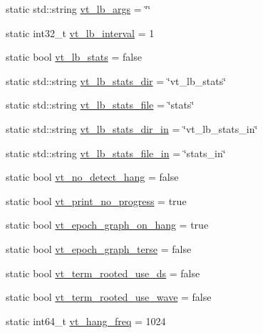 \begin{DoxyCompactItemize}
static std\+::string \hyperlink{structvt_1_1arguments_1_1_arg_config_aa9c190d04d0c6f9b3dac4ac56ac1a721}{vt\+\_\+lb\+\_\+args} = \char`\"{}\char`\"{}
\item 
static int32\+\_\+t \hyperlink{structvt_1_1arguments_1_1_arg_config_a273268a11a1525ad3754c72f5e6494b3}{vt\+\_\+lb\+\_\+interval} = 1
\item 
static bool \hyperlink{structvt_1_1arguments_1_1_arg_config_adf22250e9e2d60c5c57f41b8050f4697}{vt\+\_\+lb\+\_\+stats} = false
\item 
static std\+::string \hyperlink{structvt_1_1arguments_1_1_arg_config_a279d3953c475ea80bac06e2ed5ba6b5f}{vt\+\_\+lb\+\_\+stats\+\_\+dir} = \char`\"{}vt\+\_\+lb\+\_\+stats\char`\"{}
\item 
static std\+::string \hyperlink{structvt_1_1arguments_1_1_arg_config_ad6c76c8ec1dd43338a10f35929ce53f7}{vt\+\_\+lb\+\_\+stats\+\_\+file} = \char`\"{}stats\char`\"{}
\item 
static std\+::string \hyperlink{structvt_1_1arguments_1_1_arg_config_a2db08bf2d315dad981aaa9f5f79d31a5}{vt\+\_\+lb\+\_\+stats\+\_\+dir\+\_\+in} = \char`\"{}vt\+\_\+lb\+\_\+stats\+\_\+in\char`\"{}
\item 
static std\+::string \hyperlink{structvt_1_1arguments_1_1_arg_config_a7b294f12d448dcfe20f418db26a509bf}{vt\+\_\+lb\+\_\+stats\+\_\+file\+\_\+in} = \char`\"{}stats\+\_\+in\char`\"{}
\item 
static bool \hyperlink{structvt_1_1arguments_1_1_arg_config_a567d431e527d7a77c2bbddb4c52b781e}{vt\+\_\+no\+\_\+detect\+\_\+hang} = false
\item 
static bool \hyperlink{structvt_1_1arguments_1_1_arg_config_a6bbdd118f6e731cd446afb5e33af11bf}{vt\+\_\+print\+\_\+no\+\_\+progress} = true
\item 
static bool \hyperlink{structvt_1_1arguments_1_1_arg_config_ac691ea78d2c3079f3600f053f4fffa11}{vt\+\_\+epoch\+\_\+graph\+\_\+on\+\_\+hang} = true
\item 
static bool \hyperlink{structvt_1_1arguments_1_1_arg_config_a86447854a05bfbe2223a2e5a3561e78f}{vt\+\_\+epoch\+\_\+graph\+\_\+terse} = false
\item 
static bool \hyperlink{structvt_1_1arguments_1_1_arg_config_a7fad2709c0787c6ae775a83680ad9914}{vt\+\_\+term\+\_\+rooted\+\_\+use\+\_\+ds} = false
\item 
static bool \hyperlink{structvt_1_1arguments_1_1_arg_config_a1bd318b03ae9b5e87c2c7f2cde4a2a72}{vt\+\_\+term\+\_\+rooted\+\_\+use\+\_\+wave} = false
\item 
static int64\+\_\+t \hyperlink{structvt_1_1arguments_1_1_arg_config_a8bcbaf567f64aac567993c064179a5e5}{vt\+\_\+hang\+\_\+freq} = 1024

\end{DoxyCompactItemize}
